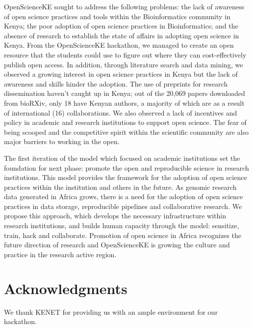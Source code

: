 \documentclass[10pt,letterpaper]{article}
\begin{document}
OpenScienceKE sought to address the following problems: the lack of awareness of open science practices and tools within the Bioinformatics community in Kenya; the poor adoption of open science practices in Bioinformatics; and the absence of research to establish the state of affairs in adopting open science in Kenya. From the OpenScienceKE hackathon, we managed to create an open resource that the students could use to figure out where they can cost-effectively publish open access. In addition, through literature search and data mining, we observed a growing interest in open science practices in Kenya but the lack of awareness and skills hinder the adoption. The use of preprints for research dissemination haven’t caught up in Kenya; out of the 20,069 papers downloaded from bioRXiv, only 18 have Kenyan authors, a majority of which are as a result of international (16) collaborations. We also observed a lack of incentives and policy in academic and research institutions to support open science.  The fear of being scooped and the competitive spirit within the scientific community are also major barriers to working in the open. 

The first iteration of the model which focused on academic institutions set the foundation for next phase: promote the open and reproducible science in research institutions. This model provides the framework for the adoption of open science practices within the institution and others in the future. As genomic research data generated in Africa grows, there is a need for the adoption of open science practices in data storage, reproducible pipelines and collaborative research. We propose this approach, which develops the necessary infrastructure within research institutions, and builds human capacity through the model: sensitize, train, hack and collaborate. Promotion of open science in Africa recognizes the future direction of research and OpenScienceKE is growing the culture and practice in the research active region. 

\linenumbers




\section*{Acknowledgments}
We thank KENET for providing us with an ample environment for our hackathon. 

\nolinenumbers




\end{document}
